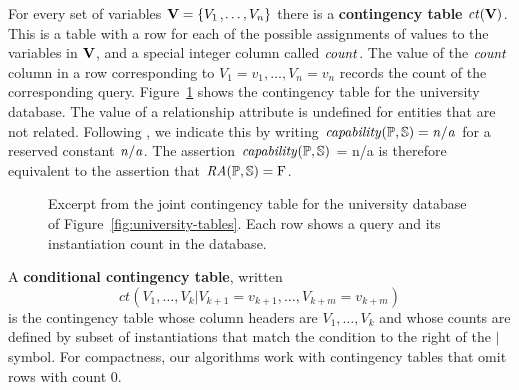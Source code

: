 \documentclass{vldb}
\newcommand{\ct}{\mathit{ct}}
\begin{document}
For every set of variables $\set{V} = \{\V_{1}$,$\ldots,\V_{n} \}$ there is a \textbf{contingency table} $\ct(\set{V})$. %
This is a table with a row for each of the possible assignments of values to the variables in $\set{V}$, and a special integer column called $\qcount$. 
The value of the $\qcount$ column in a row 
corresponding to $V_{1} = v_{1},\ldots,V_{n} = v_{n}$ records the count of the 
corresponding query. 
Figure~\ref{fig:ct} shows the contingency table for the university database. 
The value of a relationship attribute is undefined for entities that are not related.
Following \cite{Milch2007}, %
we indicate this by writing 
$\it{capability(\P,\S)} = n/a $ for a reserved constant $\it{n/a}$. 
The assertion $\it{capability(\P,\S)}$ = n/a is therefore equivalent to the assertion that $\ra(\P,\S) = \false$.
\begin{figure}[htbp]
\begin{center}
\caption{Excerpt from the joint contingency table for the university database of Figure~\ref{fig:university-tables}. %
Each row shows a query and its instantiation count in the database.
\label{fig:ct}}
\end{center}
\end{figure}
A \textbf{conditional contingency table}, written $$\ct(V_{1},\ldots,V_{k}|V_{k+1} = v_{k+1},\ldots, V_{k+m} = v_{k+m})$$
is the contingency table whose column headers are $V_{1},\ldots,V_{k}$ and whose counts are  defined by subset of instantiations that match the condition to the right of the $\vert$ symbol.  %
For compactness, our algorithms work with contingency tables that omit rows with count 0.
\end{document}
